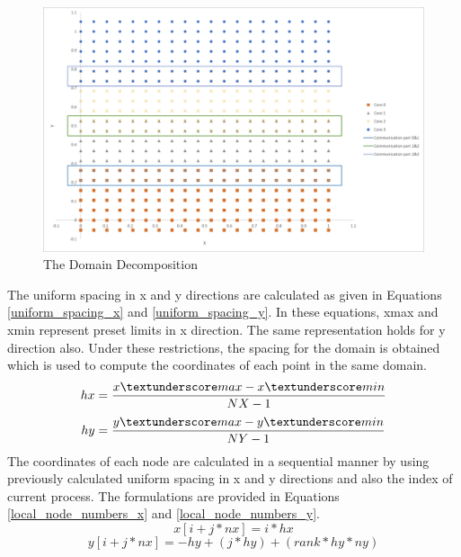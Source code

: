 \documentclass{article}
\begin{document}
\begin{figure}[hbt!]
    \centering
    \includegraphics[width=1\textwidth]{Figures/decomposion.png}
    \caption{The Domain Decomposition}
    \label{figure_1}
\end{figure}
The uniform spacing in x and y directions are calculated as given in Equations \ref{uniform_spacing_x} and \ref{uniform_spacing_y}. In these equations, x\textunderscore max and x\textunderscore min represent preset limits in x direction. The same representation holds for y direction also. Under these restrictions, the spacing for the domain is obtained which is used to compute the coordinates of each point in the same domain. 
\begin{equation} %
    hx = \frac{x\textunderscore max - x\textunderscore min}{NX - 1}
    \label{uniform_spacing_x}
\end{equation}
\begin{equation} %
     hy = \frac{y\textunderscore max - y\textunderscore min}{NY - 1}
    \label{uniform_spacing_y}
\end{equation}
The coordinates of each node are calculated in a sequential manner by using previously calculated uniform spacing in x and y directions and also the index of current process. The formulations are provided in Equations \ref{local_node_numbers_x} and \ref{local_node_numbers_y}. 
\begin{equation} %
    x[i+j*nx] = i*hx 
    \label{x_points}
\end{equation}
\begin{equation} %
     y[i+j*nx]= -hy + ( j*hy) + (rank * hy * ny)
    \label{y_points}
\end{equation}
\end{document}
